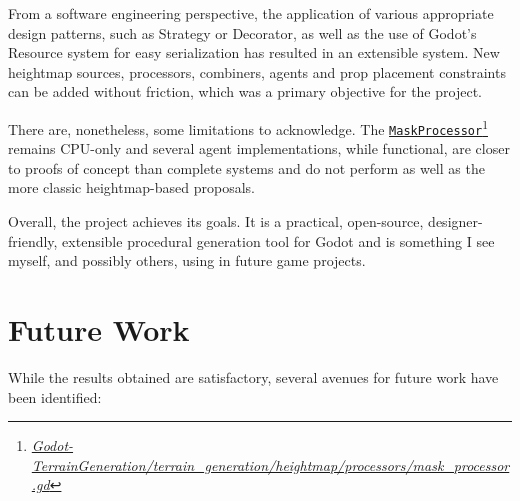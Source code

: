 From a software engineering perspective, the application of various appropriate design patterns, such as Strategy or Decorator, as well as the use of Godot's Resource system for easy serialization has resulted in an extensible system.
New heightmap sources, processors, combiners, agents and prop placement constraints can be added without friction, which was a primary objective for the project.

There are, nonetheless, some limitations to acknowledge.
The \href{{https://github.com/fsande/TFG---Eric-Rios/blob/main/Godot-TerrainGeneration/terrain_generation/heightmap/processors/mask_processor.gd}}{\texttt{MaskProcessor}}\footnote{\href{{https://github.com/fsande/TFG---Eric-Rios/blob/main/Godot-TerrainGeneration/terrain_generation/heightmap/processors/mask_processor.gd}}{\textit{Godot-TerrainGeneration/terrain\_generation/heightmap/processors/mask\_processor.gd}}} remains CPU-only and several agent implementations, while functional, are closer to proofs of concept than complete systems and do not perform as well as the more classic heightmap-based proposals.

Overall, the project achieves its goals.
It is a practical, open-source, designer-friendly, extensible procedural generation tool for Godot and is something I see myself, and possibly others, using in future game projects.


\section{Future Work}
While the results obtained are satisfactory, several avenues for future work have been identified:


